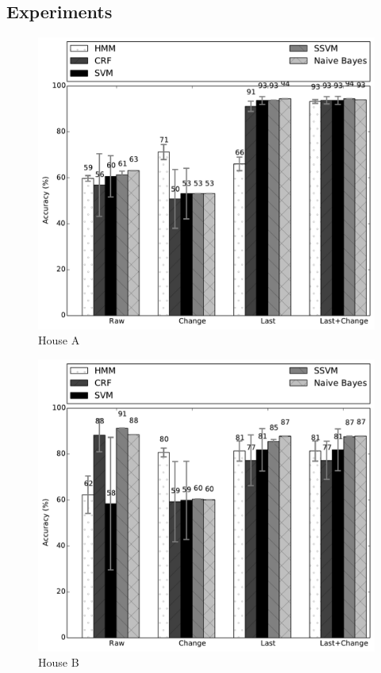 \documentclass[11pt, oneside]{article}   	%
\begin{document}
\subsection{Experiments}
\begin{figure}[t!]
\begin{center}
\includegraphics[width=5in]{../../src/reports/A.pdf}
\end{center}
\vspace{-0.5cm}
\caption{House A}
\label{fig:house_a}
\vspace{-0.5cm}
\end{figure}

\begin{figure}[t!]
\begin{center}
\includegraphics[width=5in]{../../src/reports/B.pdf}
\end{center}
\vspace{-0.5cm}
\caption{House B}
\label{fig:house_b}
\vspace{-0.5cm}
\end{figure}
\end{document}
